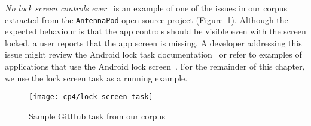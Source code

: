 \textit{No lock screen controls ever}~\cite{git3578}
is an example of one of the issues in our corpus extracted from the \texttt{AntennaPod} open-source project (Figure~\ref{fig:lock-screen-task}).
Although the expected behaviour is that the app controls should be visible even with the screen locked,  a user reports that the app screen is missing.
A developer addressing this issue might review the Android lock task documentation~\cite{apiLockTask}
or refer to examples of applications that use the Android lock screen~\cite{mediumLockApp}.
For the remainder of this chapter, we use the lock screen task as a running example.


\begin{figure}
    \centering
    \texttt{[image: cp4/lock-screen-task]}
    \caption{Sample GitHub task from our corpus}
    \label{fig:lock-screen-task}
\end{figure}